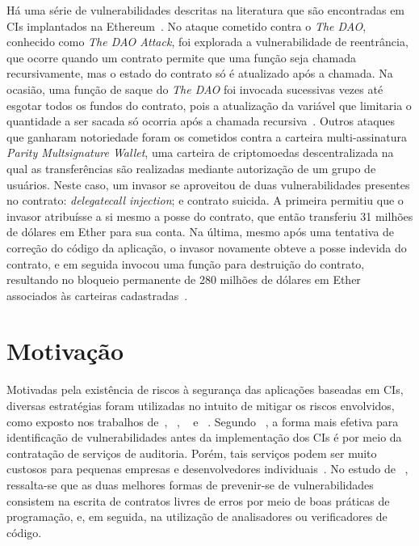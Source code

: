 Há uma série de vulnerabilidades descritas na literatura que são encontradas em CIs implantados na Ethereum~\cite{atzei2017survey-attacks-sok, chen2020survey-ethereum-acm, dika2018security}. No ataque cometido contra o \textit{The DAO}, conhecido como \textit{The DAO Attack}, foi explorada a vulnerabilidade de reentrância, que ocorre quando um contrato permite que uma função seja chamada recursivamente, mas o estado do contrato só é atualizado após a chamada. Na ocasião, uma função de saque do \textit{The DAO} foi invocada sucessivas vezes até esgotar todos os fundos do contrato, pois a atualização da variável que limitaria o quantidade a ser sacada só ocorria após a chamada recursiva~\cite{atzei2017survey-attacks-sok}. Outros ataques que ganharam notoriedade foram os cometidos contra a carteira multi-assinatura \textit{Parity Multsignature Wallet}, uma carteira de criptomoedas descentralizada na qual as transferências são realizadas mediante autorização de um grupo de usuários. Neste caso, um invasor se aproveitou de duas vulnerabilidades presentes no contrato: \textit{delegatecall injection}; e contrato suicida. A primeira permitiu que o invasor atribuísse a si mesmo a posse do contrato, que então transferiu 31 milhões de dólares em Ether para sua conta. Na última, mesmo após uma tentativa de correção do código da aplicação, o invasor novamente obteve a posse indevida do contrato, e em seguida invocou uma função para destruição do contrato, resultando no bloqueio permanente de 280 milhões de dólares em Ether associados às carteiras cadastradas~\cite{chen2020survey-ethereum-acm, destefanis2018smart-parity-wallet, knownattacks2018}. 

\section{Motivação}

Motivadas pela existência de riscos à segurança das aplicações baseadas em CIs, diversas estratégias foram utilizadas no intuito de mitigar os riscos envolvidos, como exposto nos trabalhos de~, ~, ~ e ~. Segundo ~, a forma mais efetiva para identificação de vulnerabilidades antes da implementação dos CIs é por meio da contratação de serviços de auditoria. Porém, tais serviços podem ser muito custosos para pequenas empresas e desenvolvedores individuais~\cite{dika2018security}. No estudo de ~, ressalta-se que as duas melhores formas de prevenir-se de vulnerabilidades consistem na escrita de contratos livres de erros por meio de boas práticas de programação, e, em seguida, na utilização de analisadores ou verificadores de código.  

